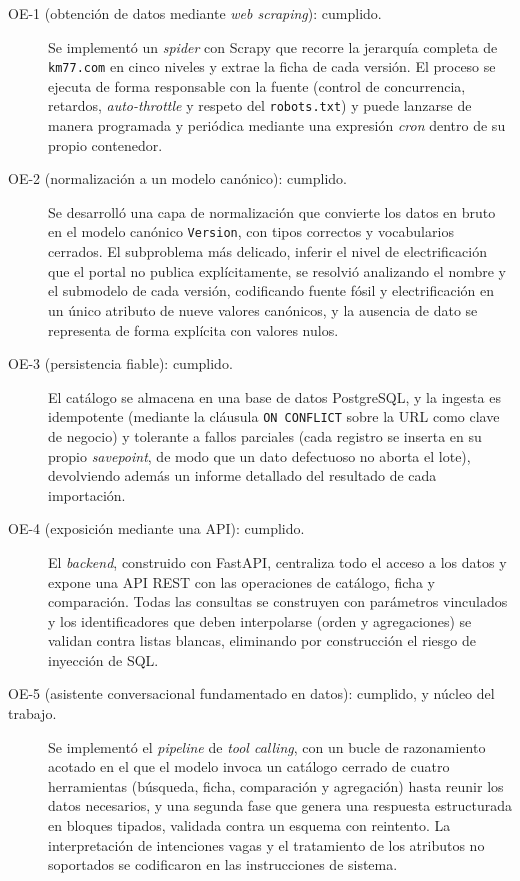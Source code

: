 \begin{description}
  \item[OE-1 (obtención de datos mediante \emph{web scraping}): cumplido.] Se
        implementó un \emph{spider} con Scrapy que recorre la jerarquía completa de
        \texttt{km77.com} en cinco niveles y extrae la ficha de cada versión. El
        proceso se ejecuta de forma responsable con la fuente (control de
        concurrencia, retardos, \emph{auto-throttle} y respeto del
        \texttt{robots.txt}) y puede lanzarse de manera programada y periódica
        mediante una expresión \emph{cron} dentro de su propio contenedor.

  \item[OE-2 (normalización a un modelo canónico): cumplido.] Se desarrolló una
        capa de normalización que convierte los datos en bruto en el modelo
        canónico \texttt{Version}, con tipos correctos y vocabularios cerrados. El
        subproblema más delicado, inferir el nivel de electrificación que el portal
        no publica explícitamente, se resolvió analizando el nombre y el submodelo
        de cada versión, codificando fuente fósil y electrificación en un
        único atributo de nueve valores canónicos, y la ausencia de dato se
        representa de forma explícita con valores nulos.

  \item[OE-3 (persistencia fiable): cumplido.] El catálogo se almacena en una base
        de datos PostgreSQL, y la ingesta es idempotente (mediante la cláusula
        \texttt{ON CONFLICT} sobre la URL como clave de negocio) y tolerante a
        fallos parciales (cada registro se inserta en su propio \emph{savepoint}, de
        modo que un dato defectuoso no aborta el lote), devolviendo además un
        informe detallado del resultado de cada importación.

  \item[OE-4 (exposición mediante una API): cumplido.] El \emph{backend},
        construido con FastAPI, centraliza todo el acceso a los datos y expone una
        API REST con las operaciones de catálogo, ficha y comparación. Todas las
        consultas se construyen con parámetros vinculados y los identificadores que
        deben interpolarse (orden y agregaciones) se validan contra listas blancas,
        eliminando por construcción el riesgo de inyección de SQL.

  \item[OE-5 (asistente conversacional fundamentado en datos): cumplido, y núcleo
        del trabajo.] Se implementó el \emph{pipeline} de \emph{tool calling}, con
        un bucle de razonamiento acotado en el que el modelo invoca un catálogo
        cerrado de cuatro herramientas (búsqueda, ficha, comparación y agregación)
        hasta reunir los datos necesarios, y una segunda fase que genera una
        respuesta estructurada en bloques tipados, validada contra un esquema con
        reintento. La interpretación de intenciones vagas y el tratamiento de los
        atributos no soportados se codificaron en las instrucciones de sistema.


\end{description}
